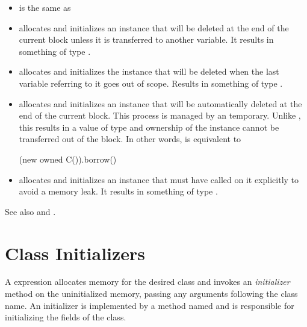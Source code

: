 \begin{itemize}

  \item {} is the same as 

  \item {} allocates and initializes an instance that
    will be deleted at the end of the current block unless it is
    transferred to another  variable. It results in something
    of type .

  \item {} allocates and initializes the instance that
    will be deleted when the last  variable referring to it
    goes out of scope. Results in something of type .

  \item {} allocates and initializes an instance
    that will be automatically deleted at the end of the current block.
    This process is managed by an  temporary.  Unlike
    , this results in a value of type  and ownership of the instance cannot be transferred out of the
    block. In other words,  is equivalent to
    \begin{chapel}
      (new owned C()).borrow()
    \end{chapel}

  \item {} allocates and initializes an instance
    that must have  called on it explicitly to avoid a
    memory leak. It results in something of type .

\end{itemize}

See also  and .

\section{Class Initializers}
\label{Class_Initializers}

A  expression allocates memory for the desired class and invokes
an {\em initializer} method on the uninitialized memory, passing any arguments
following the class name. An initializer is implemented by a method named
 and is responsible for initializing the fields of the class.

